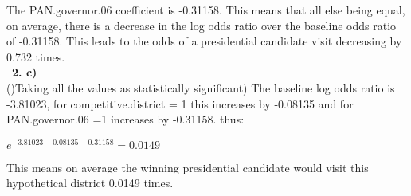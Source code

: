 \documentclass{article}
\begin{document}
The PAN.governor.06 coefficient is -0.31158. This means that all else being equal, on average, there is a decrease in the log odds ratio over the baseline odds ratio of -0.31158. This leads to the odds of a presidential candidate visit decreasing by 0.732 times.\\
\
\textbf{2. c)\\}
()Taking all the values as statistically significant) The baseline log odds ratio is -3.81023, for competitive.district = 1 this increases by -0.08135 and for PAN.governor.06 =1 increases by -0.31158. thus:
\begin{center}
	$e^{-3.81023-0.08135-0.31158} = 0.0149$
\end{center}
This means on average the winning presidential candidate would visit this hypothetical district 0.0149 times.
\end{document}
